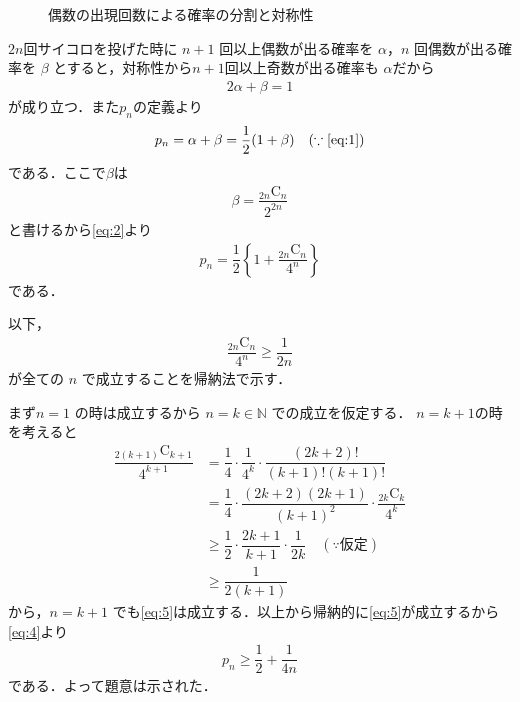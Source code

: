 \documentclass[../../main.tex]{subfiles}
\begin{document}
\begin{figure}[htbp]
  \caption{偶数の出現回数による確率の分割と対称性}
  \label{fig:even_prob_symmetry}
\end{figure}

$2n$回サイコロを投げた時に $n+1$ 回以上偶数が出る確率を $\alpha$，$n$ 回偶数が出る確率を $\beta$ とすると，対称性から$n+1$回以上奇数が出る確率も $\alpha$だから
\begin{align}
  2\alpha + \beta = 1 \label{eq:1}
\end{align}
が成り立つ．また$p_n$の定義より
\begin{align}
  p_n = \alpha + \beta = \dfrac{1}{2}(1+\beta) \quad (\because\text{\cref{eq:1}}) \label{eq:2}
\end{align}
である．ここで$\beta$は
\begin{align}
  \beta = \dfrac{{}_{2n}\text{C}_n}{2^{2n}} \label{eq:3}
\end{align}
と書けるから\cref{eq:2}より
\begin{align}
  p_n =  \dfrac{1}{2} \left\{ 1 + \dfrac{{}_{2n}\text{C}_n}{4^n} \right\} \label{eq:4}
\end{align}
である．

以下，
\begin{align}
  \dfrac{{}_{2n}\text{C}_n}{4^n} \ge \dfrac{1}{2n} \label{eq:5}
\end{align}
が全ての $n$ で成立することを帰納法で示す．

まず$n=1$ の時は成立するから $n=k \in \mathbb{N}$ での成立を仮定する．
$n=k+1$の時を考えると
\begin{align}
  \dfrac{{}_{2(k+1)}\text{C}_{k+1}}{4^{k+1}}
  &= \dfrac{1}{4} \cdot \dfrac{1}{4^k} \cdot \dfrac{(2k+2)!}{(k+1)!(k+1)!} \\
  &= \dfrac{1}{4} \cdot \dfrac{(2k+2)(2k+1)}{(k+1)^2} \cdot \dfrac{{}_{2k}\text{C}_k}{4^k} \\
  &\ge \dfrac{1}{2} \cdot \dfrac{2k+1}{k+1} \cdot \dfrac{1}{2k} \quad (\because\text{仮定}) \\
  &\ge \dfrac{1}{2(k+1)}
\end{align}
から，$n=k+1$ でも\cref{eq:5}は成立する．以上から帰納的に\cref{eq:5}が成立するから\cref{eq:4}より
\begin{align}
  p_n \ge \dfrac{1}{2} + \dfrac{1}{4n}
\end{align}
である．よって題意は示された．
\end{document}
